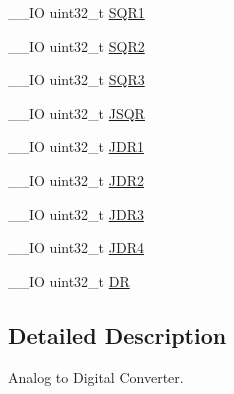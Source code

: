 \begin{DoxyCompactItemize}
\item 
\-\_\-\-\_\-\-I\-O uint32\-\_\-t \hyperlink{struct_a_d_c___type_def_a3302e1bcfdfbbfeb58779d0761fb377c}{S\-Q\-R1}
\item 
\-\_\-\-\_\-\-I\-O uint32\-\_\-t \hyperlink{struct_a_d_c___type_def_aab440b0ad8631f5666dd32768a89cf60}{S\-Q\-R2}
\item 
\-\_\-\-\_\-\-I\-O uint32\-\_\-t \hyperlink{struct_a_d_c___type_def_a97e40d9928fa25a5628d6442f0aa6c0f}{S\-Q\-R3}
\item 
\-\_\-\-\_\-\-I\-O uint32\-\_\-t \hyperlink{struct_a_d_c___type_def_a75e0cc079831adcc051df456737d3ae4}{J\-S\-Q\-R}
\item 
\-\_\-\-\_\-\-I\-O uint32\-\_\-t \hyperlink{struct_a_d_c___type_def_a22fa21352be442bd02f9c26a1013d598}{J\-D\-R1}
\item 
\-\_\-\-\_\-\-I\-O uint32\-\_\-t \hyperlink{struct_a_d_c___type_def_ae9156af81694b7a85923348be45a2167}{J\-D\-R2}
\item 
\-\_\-\-\_\-\-I\-O uint32\-\_\-t \hyperlink{struct_a_d_c___type_def_a3a54028253a75a470fccf841178cba46}{J\-D\-R3}
\item 
\-\_\-\-\_\-\-I\-O uint32\-\_\-t \hyperlink{struct_a_d_c___type_def_a9274ceea3b2c6d5c1903d0a7abad91a1}{J\-D\-R4}
\item 
\-\_\-\-\_\-\-I\-O uint32\-\_\-t \hyperlink{struct_a_d_c___type_def_a3df0d8dfcd1ec958659ffe21eb64fa94}{D\-R}
\end{DoxyCompactItemize}


\subsection{Detailed Description}
Analog to Digital Converter. 

